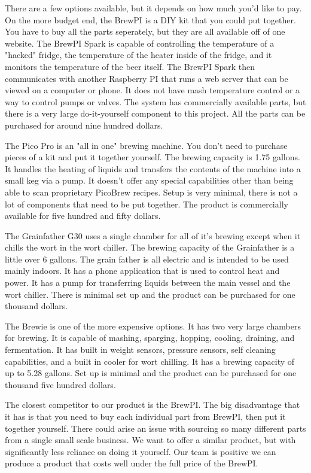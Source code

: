 
There are a few options available, but it depends on how much you'd like to pay.
On the more budget end, the BrewPI is a DIY kit that you could put together. You
have to buy all the parts seperately, but they are all available off of one
website. The BrewPI Spark is capable of controlling the temperature of a
"hacked" fridge, the temperature of the heater inside of the fridge, and it
monitors the temperature of the beer itself. The BrewPI Spark then communicates
with another Raspberry PI that runs a web server that can be viewed on a
computer or phone. It does not have mash temperature control or a way to control
pumps or valves. The system has commercially available parts, but there is a
very large do-it-yourself component to this project. All the parts can be
purchased for around nine hundred dollars. \cite{Jacobs_2017} 

The Pico Pro is an "all in one" brewing machine. You don't need to purchase
pieces of a kit and put it together yourself. The brewing capacity is 1.75
gallons. It handles the heating of liquids
and transfers the contents of the machine into a small keg via a pump. It
doesn't offer any special capabilities other than being able to scan proprietary
PicoBrew recipes. Setup is very minimal, there is not a lot of components that
need to be put together. The product is commercially available for five hundred
and fifty dollars. \cite{Pico_2021}

The Grainfather G30 uses a single chamber for all of it's brewing except when it
chills the wort in the wort chiller. The brewing capacity of the Grainfather is
a little over 6 gallons. The grain father is all electric and is
intended to be used mainly indoors. \cite{AllGrain_2021} It has a phone application that is used to
control heat and power. It has a pump for transferring liquids between the main
vessel and the wort chiller. There is minimal set up and the product can be
purchased for one thousand dollars. \cite{Grainfather_2019} 
        
The Brewie is one of the more expensive options. It has two very large chambers
for brewing. It is capable of mashing, sparging, hopping, cooling, draining, and
fermentation. It has built in weight sensors, pressure sensors, self cleaning
capabilities, and a built in cooler for wort chilling. It has a brewing capacity
of up to 5.28 gallons. Set up is minimal and the product can be purchased for
one thousand five hundred dollars. \cite{MoreBeer_2020}

The closest competitor to our product is the BrewPI. The big disadvantage
that it has is that you need to buy each individual part from BrewPI, then put it
together yourself. There could arise an issue with sourcing so many different parts from
a single small scale business. We want to offer a similar product, but with
significantly less reliance on doing it yourself. Our team is positive we can
produce a product that costs well under the full price of the BrewPI. 
